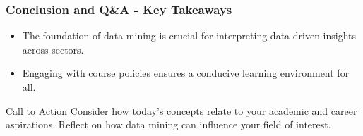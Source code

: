 \documentclass[aspectratio=169]{beamer}
\begin{document}
\begin{frame}[fragile]
    \frametitle{Conclusion and Q\&A - Key Takeaways}
    \begin{itemize}
        \item The foundation of data mining is crucial for interpreting data-driven insights across sectors.
        \item Engaging with course policies ensures a conducive learning environment for all.
    \end{itemize}

    \begin{block}{Call to Action}
        Consider how today's concepts relate to your academic and career aspirations. 
        Reflect on how data mining can influence your field of interest.
    \end{block}
\end{frame}
\end{document}
